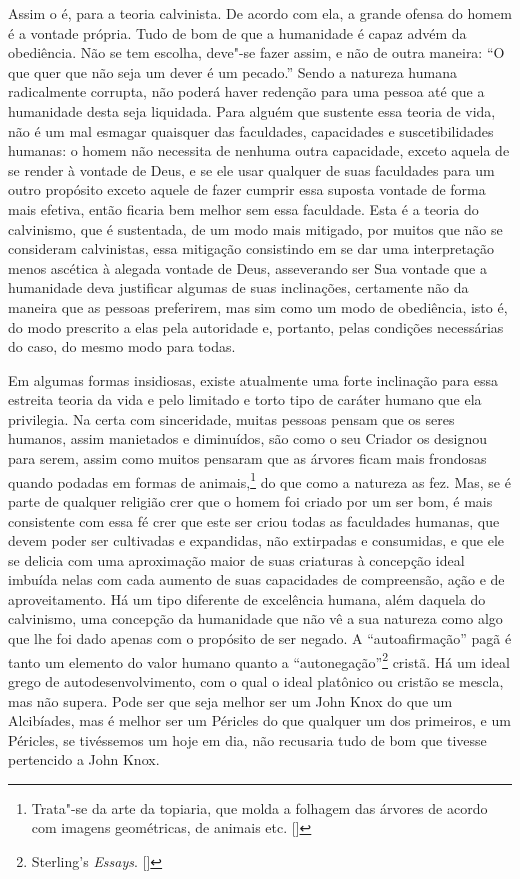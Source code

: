 Assim o é, para a teoria calvinista. De acordo com ela,
a grande ofensa do homem é a vontade própria. Tudo de bom de que a
humanidade é capaz advém da obediência. Não se tem escolha, deve"-se
fazer assim, e não de outra maneira: “O que quer que não seja um dever
é um pecado.” Sendo a natureza humana radicalmente corrupta, não
poderá haver redenção para uma pessoa até que a humanidade desta
seja liquidada. Para alguém que sustente essa teoria de vida, não é um
mal esmagar quaisquer das faculdades, capacidades e suscetibilidades
humanas: o homem não necessita de nenhuma outra capacidade, exceto
aquela de se render à vontade de Deus, e se ele usar qualquer de suas
faculdades para um outro propósito exceto aquele de fazer cumprir
essa suposta vontade de forma mais efetiva, então ficaria bem melhor
sem essa faculdade. Esta é a teoria do calvinismo, que é sustentada, de
um modo mais mitigado, por muitos que não se consideram calvinistas,
essa mitigação consistindo em se dar uma interpretação menos ascética
à alegada vontade de Deus, asseverando ser Sua vontade que a humanidade
deva justificar algumas de suas inclinações, certamente não da maneira
que as pessoas preferirem, mas sim como um modo de obediência, isto é,
do modo prescrito a elas pela autoridade e, portanto, pelas condições
necessárias do caso, do mesmo modo para todas.

Em algumas formas insidiosas, existe atualmente uma forte
inclinação para essa estreita teoria da vida e pelo limitado e torto
tipo de caráter humano que ela privilegia. Na certa com sinceridade,
muitas pessoas pensam que os seres humanos, assim manietados e
diminuídos, são como o seu Criador os designou para serem, assim como
muitos pensaram que as árvores ficam mais frondosas quando podadas em
formas de animais,\footnote{ Trata"-se da arte da topiaria, que molda
a folhagem das árvores de acordo com imagens geométricas, de animais
etc. []} do que como a natureza as fez. Mas,
se é parte de qualquer religião crer que o homem foi criado por um ser
bom, é mais consistente com essa fé crer que este ser criou todas as
faculdades humanas, que devem poder ser cultivadas e expandidas, não
extirpadas e consumidas, e que ele se delicia com uma aproximação maior
de suas criaturas à concepção ideal imbuída nelas com cada aumento de suas
capacidades de compreensão, ação e de aproveitamento. Há um tipo
diferente de excelência humana, além daquela do calvinismo, uma
concepção da humanidade que não vê a sua natureza como algo que 
lhe foi dado apenas com o propósito de ser negado. A “autoafirmação”
pagã é tanto um elemento do valor humano quanto a
“autonegação”\footnote{ Sterling's \textit{Essays}. []}
cristã. Há um ideal grego de autodesenvolvimento, com o qual o ideal
platônico ou cristão se mescla, mas não supera. Pode ser que seja
melhor ser um John Knox do que um Alcibíades, mas é melhor ser um
Péricles do que qualquer um dos primeiros, e um Péricles,
se tivéssemos um hoje em dia, não recusaria tudo de bom que tivesse
pertencido a John Knox. 

